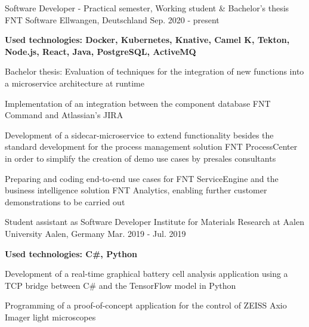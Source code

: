 

\begin{cventries}

\cventry
  {Software Developer - Practical semester, Working student \& Bachelor's thesis} %
  {\faBuilding{} FNT Software} %
  {Ellwangen, Deutschland} %
  {Sep. 2020 - present} %
  {
    \begin{cvitems} %
      {\scriptsize\textbf{Used technologies: Docker, Kubernetes, Knative, Camel K, Tekton, Node.js, React, Java, PostgreSQL, ActiveMQ}}
      \item {}
      \item {Bachelor thesis: Evaluation of techniques for the integration of new functions into a microservice architecture at runtime}
      \item {Implementation of an integration between the component database FNT Command and Atlassian's JIRA}
      \item {Development of a sidecar-microservice to extend functionality besides the standard development for the process management solution FNT ProcessCenter in order to simplify the creation of demo use cases by presales consultants}
      \item {Preparing and coding end-to-end use cases for FNT ServiceEngine and the business intelligence solution FNT Analytics, enabling further customer demonstrations to be carried out}
    \end{cvitems} 
  }

  \cventry
    {Student assistant as Software Developer} %
    {\faFlask{} Institute for Materials Research at Aalen University} %
    {Aalen, Germany} %
    {Mar. 2019 - Jul. 2019} %
    {
      \begin{cvitems} %
        {\scriptsize\textbf{Used technologies: C\#, Python}}
        \item {}
        \item {Development of a real-time graphical battery cell analysis application using a TCP bridge between C\# and the TensorFlow model in Python}
        \item {Programming of a proof-of-concept application for the control of ZEISS Axio Imager light microscopes}
      \end{cvitems}
    }


\end{cventries}
